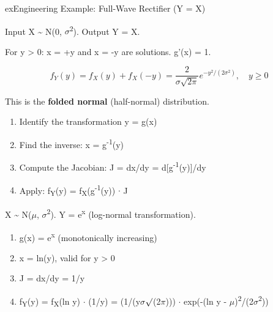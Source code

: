 \begin{PSbox}[unbreakable]{ex}{Engineering Example: Full-Wave Rectifier (Y = \textbar{}X\textbar{})}

Input X \textasciitilde{} N(0, \ensuremath{\sigma}\textsuperscript{2}). Output Y = \textbar{}X\textbar{}.

For y \textgreater{} 0: x = +y and x = -y are solutions. \textbar{}g’(x)\textbar{} = 1.

\[f_Y(y) = f_X(y) + f_X(-y) = \frac{2}{\sigma\sqrt{2\pi}} e^{-y^2/(2\sigma^2)}, \quad y \geq 0\]

This is the \textbf{folded normal} (half-normal) distribution.

\end{PSbox}



\begin{enumerate}
\def\labelenumi{\arabic{enumi}.}
\tightlist
\item
  Identify the transformation y = g(x)
\item
  Find the inverse: x = g\textsuperscript{-1}(y)
\item
  Compute the Jacobian: J = \textbar{}dx/dy\textbar{} = \textbar{}d[g\textsuperscript{-1}(y)]/dy\textbar{}
\item
  Apply: f\textsubscript{Y}(y) = f\textsubscript{X}(g\textsuperscript{-1}(y)) \ensuremath{\cdot} \textbar{}J\textbar{}
\end{enumerate}


X \textasciitilde{} N(\ensuremath{\mu}, \ensuremath{\sigma}\textsuperscript{2}). Y = e\textsuperscript{x} (log-normal transformation).

\begin{enumerate}
\def\labelenumi{\arabic{enumi}.}
\tightlist
\item
  g(x) = e\textsuperscript{x} (monotonically increasing)
\item
  x = ln(y), valid for y \textgreater{} 0
\item
  J = \textbar{}dx/dy\textbar{} = 1/y
\item
  f\textsubscript{Y}(y) = f\textsubscript{X}(ln y) \ensuremath{\cdot} (1/y) = (1/(y\ensuremath{\sigma}\ensuremath{\surd}(2\ensuremath{\pi}))) \ensuremath{\cdot} exp(-(ln y - \ensuremath{\mu})\textsuperscript{2}/(2\ensuremath{\sigma}\textsuperscript{2}))
\end{enumerate}

